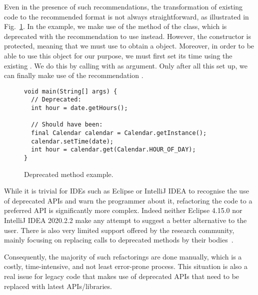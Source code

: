 \documentclass[runningheads,a4paper]{llncs}
\begin{document}
Even in the presence of such recommendations, the transformation of
existing code to the recommended format is not always straightforward,
as illustrated in Fig.~\ref{ex:deprecated-method-other}. In the example, we
make use of the  method of the  class,
which is deprecated with the 
recommendation to use  instead.
However,
the  constructor is protected,
meaning that we must use  to obtain a
 object. Moreover, in order to be able to use this  object for our purpose,
we must first set its time using the existing .
We do this by calling  with  as argument.
Only after all this set up, we can finally make use of the recommendation
.

\begin{figure}
\begin{lstlisting}[mathescape=true,showstringspaces=false]
void main(String[] args) {
  // Deprecated:
  int hour = date.getHours();
  
  // Should have been:
  final Calendar calendar = Calendar.getInstance();
  calendar.setTime(date);
  int hour = calendar.get(Calendar.HOUR_OF_DAY);
}
\end{lstlisting}
\caption{Deprecated method example.}
\label{ex:deprecated-method-other}
\end{figure}


While it is trivial for IDEs such as Eclipse or IntelliJ IDEA to
recognise the use of deprecated APIs and warn the programmer about it,
refactoring the code to a preferred API is significantly more
complex. Indeed neither Eclipse 4.15.0 nor IntelliJ IDEA 2020.2.2 make
any attempt to suggest a better alternative to the user. There is also
very limited support offered by the research community, mainly
focusing on replacing calls to deprecated methods by their
bodies~\cite{DBLP:conf/paste/Perkins05}. 

Consequently, the majority of
such refactorings are done manually, which is a costly,
time-intensive, and not least error-prone process.  This situation is
also a real issue for legacy code that makes use of deprecated APIs
that need to be replaced with latest APIs/libraries.
\end{document}
